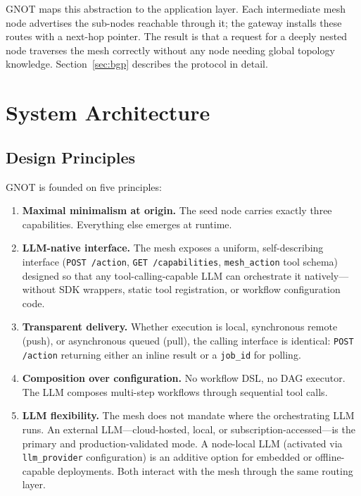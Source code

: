 \documentclass[10pt,twocolumn]{article}
\begin{document}
GNOT maps this abstraction to the application layer. Each intermediate
mesh node advertises the sub-nodes reachable through it; the gateway
installs these routes with a next-hop pointer. The result is that a
request for a deeply nested node traverses the mesh correctly without
any node needing global topology knowledge. Section~\ref{sec:bgp}
describes the protocol in detail.

\section{System Architecture}
\label{sec:arch}

\subsection{Design Principles}

GNOT is founded on five principles:

\begin{enumerate}[noitemsep, leftmargin=14pt]
  \item \textbf{Maximal minimalism at origin.} The seed node carries
    exactly three capabilities. Everything else emerges at runtime.
  \item \textbf{LLM-native interface.} The mesh exposes a uniform,
    self-describing interface (\texttt{POST /action},
    \texttt{GET /capabilities}, \texttt{mesh\_action} tool schema)
    designed so that any tool-calling-capable LLM can orchestrate it
    natively---without SDK wrappers, static tool registration, or
    workflow configuration code.
  \item \textbf{Transparent delivery.} Whether execution is local,
    synchronous remote (push), or asynchronous queued (pull), the
    calling interface is identical: \texttt{POST /action} returning
    either an inline result or a \texttt{job\_id} for polling.
  \item \textbf{Composition over configuration.} No workflow DSL, no
    DAG executor. The LLM composes multi-step workflows through
    sequential tool calls.
  \item \textbf{LLM flexibility.} The mesh does not mandate where the
    orchestrating LLM runs. An external LLM---cloud-hosted, local, or
    subscription-accessed---is the primary and production-validated
    mode. A node-local LLM (activated via \texttt{llm\_provider}
    configuration) is an additive option for embedded or
    offline-capable deployments. Both interact with the mesh through
    the same routing layer.
\end{enumerate}
\end{document}
